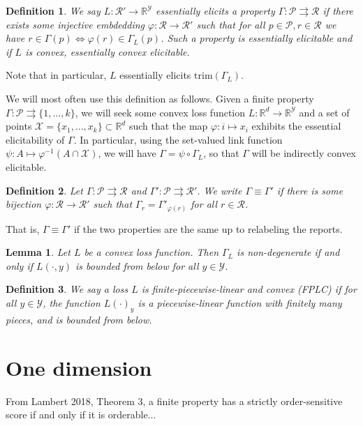 \documentclass[11pt]{article}
\newcommand{\reals}{\mathbb{R}}
\renewcommand{\P}{\mathcal{P}}
\newcommand{\R}{\mathcal{R}}
\newcommand{\X}{\mathcal{X}}
\newcommand{\Y}{\mathcal{Y}}
\renewcommand{\P}{\mathcal{P}}
\newcommand{\toto}{\rightrightarrows}
\newcommand{\trim}{\mathrm{trim}}
\newtheorem{lemma}{Lemma}
\newtheorem{definition}{Definition}
\begin{document}
\begin{definition}
  We say $L:\R'\to\reals^\Y$ \emph{essentially elicits} a property $\Gamma : \P \toto \R$ if there exists some injective embdedding $\varphi:\R\to\R'$ such that for all $p\in\P,r\in\R$ we have $r \in \Gamma(p) \iff \varphi(r) \in \Gamma_L(p)$.
  Such a property is \emph{essentially elicitable} and if $L$ is convex, \emph{essentially convex elicitable}.
\end{definition}
Note that in particular, $L$ essentially elicits $\trim(\Gamma_L)$.

We will most often use this definition as follows.
Given a finite property $\Gamma : \P \toto \{1,\ldots,k\}$, we will seek some convex loss function $L : \reals^d \to \reals^\Y$ and a set of points $\X=\{x_1,\ldots,x_k\} \subset \reals^d$ such that the map $\varphi:i\mapsto x_i$ exhibits the essential elicitability of $\Gamma$.
In particular, using the set-valued link function $\psi:A\mapsto \varphi^{-1}(A\cap\X)$, we will have $\Gamma = \psi \circ \Gamma_L$, so that $\Gamma$ will be indirectly convex elicitable.

\begin{definition}
  Let $\Gamma:\P\toto\R$ and $\Gamma':\P\toto\R'$.
  We write $\Gamma \equiv \Gamma'$ if there is some bijection $\varphi:\R\to\R'$ such that $\Gamma_r = \Gamma'_{\varphi(r)}$ for all $r\in\R$.
\end{definition}
That is, $\Gamma\equiv\Gamma'$ if the two properties are the same up to relabeling the reports.

\begin{lemma}
  Let $L$ be a convex loss function.
  Then $\Gamma_L$ is non-degenerate if and only if $L(\cdot,y)$ is bounded from below for all $y\in\Y$.
\end{lemma}

\begin{definition}
  We say a loss $L$ is \emph{finite-piecewise-linear and convex (FPLC)} if for all $y\in\Y$, the function $L(\cdot)_y$ is a piecewise-linear function with finitely many pieces, and is bounded from below.
\end{definition}

\section{One dimension}

From Lambert 2018, Theorem 3, a finite property has a strictly order-sensitive score if and only if it is orderable...
\end{document}
